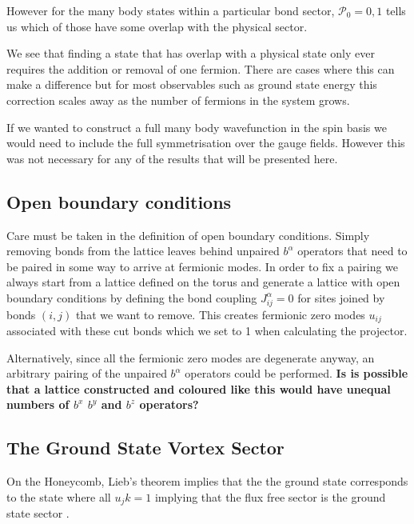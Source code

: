 However for the many body states within a particular bond sector,
\(\mathcal{P}_0 = 0,1\) tells us which of those have some overlap with
the physical sector.

We see that finding a state that has overlap with a physical state only
ever requires the addition or removal of one fermion. There are cases
where this can make a difference but for most observables such as ground
state energy this correction scales away as the number of fermions in
the system grows.

If we wanted to construct a full many body wavefunction in the spin
basis we would need to include the full symmetrisation over the gauge
fields. However this was not necessary for any of the results that will
be presented here.

\hypertarget{open-boundary-conditions}{%
\subsection{Open boundary conditions}\label{open-boundary-conditions}}

Care must be taken in the definition of open boundary conditions. Simply
removing bonds from the lattice leaves behind unpaired \(b^\alpha\)
operators that need to be paired in some way to arrive at fermionic
modes. In order to fix a pairing we always start from a lattice defined
on the torus and generate a lattice with open boundary conditions by
defining the bond coupling \(J^{\alpha}_{ij} = 0\) for sites joined by
bonds \((i,j)\) that we want to remove. This creates fermionic zero
modes \(u_{ij}\) associated with these cut bonds which we set to 1 when
calculating the projector.

Alternatively, since all the fermionic zero modes are degenerate anyway,
an arbitrary pairing of the unpaired \(b^\alpha\) operators could be
performed. \textbf{Is is possible that a lattice constructed and
coloured like this would have unequal numbers of \(b^x\) \(b^y\) and
\(b^z\) operators?}

\hypertarget{the-ground-state-vortex-sector}{%
\subsection{The Ground State Vortex
Sector}\label{the-ground-state-vortex-sector}}

On the Honeycomb, Lieb's theorem implies that the the ground state
corresponds to the state where all \(u_jk = 1\) implying that the flux
free sector is the ground state sector \textcite{lieb_flux_1994}.

